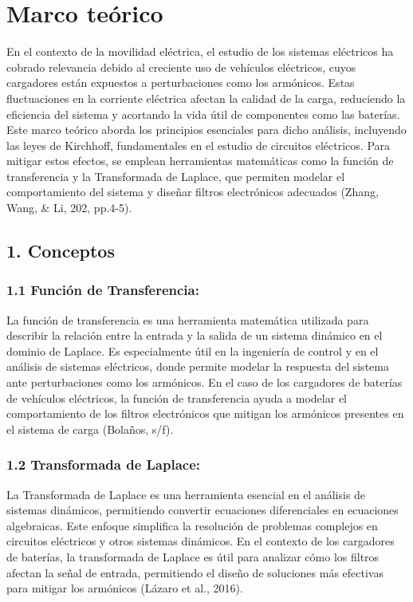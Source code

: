 \section{Marco teórico}
En el contexto de la movilidad eléctrica, el estudio de los sistemas eléctricos ha cobrado relevancia
debido al creciente uso de vehículos eléctricos, cuyos cargadores están expuestos a perturbaciones
como los armónicos. Estas fluctuaciones en la corriente eléctrica afectan la calidad de la carga,
reduciendo la eficiencia del sistema y acortando la vida útil de componentes como las baterías. Este
marco teórico aborda los principios esenciales para dicho análisis, incluyendo las leyes de Kirchhoff,
fundamentales en el estudio de circuitos eléctricos. Para mitigar estos efectos, se emplean
herramientas matemáticas como la función de transferencia y la Transformada de Laplace, que
permiten modelar el comportamiento del sistema y diseñar filtros electrónicos adecuados (Zhang,
Wang, \& Li, 202, pp.4-5).

\subsection*{1. Conceptos}

\subsubsection*{1.1 Función de Transferencia:}
La función de transferencia es una herramienta matemática utilizada para describir la
relación entre la entrada y la salida de un sistema dinámico en el dominio de Laplace. Es
especialmente útil en la ingeniería de control y en el análisis de sistemas eléctricos, donde
permite modelar la respuesta del sistema ante perturbaciones como los armónicos. En el caso
de los cargadores de baterías de vehículos eléctricos, la función de transferencia ayuda a
modelar el comportamiento de los filtros electrónicos que mitigan los armónicos presentes en
el sistema de carga (Bolaños, s/f).

\subsubsection*{1.2 Transformada de Laplace:}
La Transformada de Laplace es una herramienta esencial en el análisis de sistemas
dinámicos, permitiendo convertir ecuaciones diferenciales en ecuaciones algebraicas. Este
enfoque simplifica la resolución de problemas complejos en circuitos eléctricos y otros
sistemas dinámicos. En el contexto de los cargadores de baterías, la transformada de Laplace
es útil para analizar cómo los filtros afectan la señal de entrada, permitiendo el diseño de
soluciones más efectivas para mitigar los armónicos (Lázaro et al., 2016).

